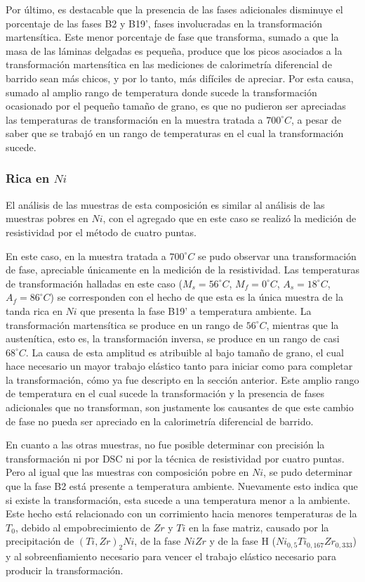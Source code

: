 \documentclass[12pt]{article}
\theoremstyle{definition}
\theoremstyle{remark}
\begin{document}
Por último, es destacable que la presencia de las fases adicionales disminuye el porcentaje de las fases B2 y B19', fases involucradas en la transformación martensítica. Este menor porcentaje de fase que transforma, sumado a que la masa de las láminas delgadas es pequeña, produce que los picos asociados a la transformación martensítica en las mediciones de calorimetría diferencial de barrido sean más chicos, y por lo tanto, más difíciles de apreciar. Por esta causa, sumado al amplio rango de temperatura donde sucede la transformación ocasionado por el pequeño tamaño de grano, es que no pudieron ser apreciadas las temperaturas de transformación en la muestra tratada a $700^\circ C$, a pesar de saber que se trabajó en un rango de temperaturas en el cual la transformación sucede.


\subsubsection{Rica en $Ni$}
\label{disNiRich}
El análisis de las muestras de esta composición es similar al análisis de las muestras pobres en $Ni$, con el agregado que en este caso se realizó la medición de resistividad por el método de cuatro puntas.

En este caso, en la muestra tratada a $700 ^\circ C$ se pudo observar una transformación de fase, apreciable únicamente en la medición de la resistividad. Las temperaturas de transformación halladas en este caso ($M_s = 56 ^\circ C$, $M_f = 0 ^\circ C$, $A_s = 18 ^\circ C$, $A_f = 86 ^\circ C$) se corresponden con el hecho de que esta es la única muestra de la tanda rica en $Ni$ que presenta la fase B19' a temperatura ambiente. La transformación martensítica se produce en un rango de $56 ^\circ C$, mientras que la austenítica, esto es, la transformación inversa, se produce en un rango de casi $68^\circ C$. La causa de esta amplitud es atribuible al bajo tamaño de grano, el cual hace necesario un mayor trabajo elástico tanto para iniciar como para completar la transformación, cómo ya fue descripto en la sección anterior. Este amplio rango de temperatura en el cual sucede la transformación y la presencia de fases adicionales que no transforman, son justamente los causantes de que este cambio de fase no pueda ser apreciado en la calorimetría diferencial de barrido.

En cuanto a las otras muestras, no fue posible determinar con precisión la transformación ni por DSC ni por la técnica de resistividad por cuatro puntas. Pero al igual que las muestras con composición pobre en $Ni$, se pudo determinar que la fase B2 está presente a temperatura ambiente. Nuevamente esto indica que si existe la transformación, esta sucede a una temperatura menor a la ambiente. Este hecho está relacionado con un corrimiento hacia menores temperaturas de la $T_0$, debido al empobrecimiento de $Zr$ y $Ti$ en la fase matriz, causado por la precipitación de $(Ti,Zr)_2 Ni$, de la fase $NiZr$ y de la fase H ($Ni_{0,5} Ti_{0,167} Zr_{0,333}$) y al sobreenfiamiento necesario para vencer el trabajo elástico necesario para producir la transformación.
\end{document}
